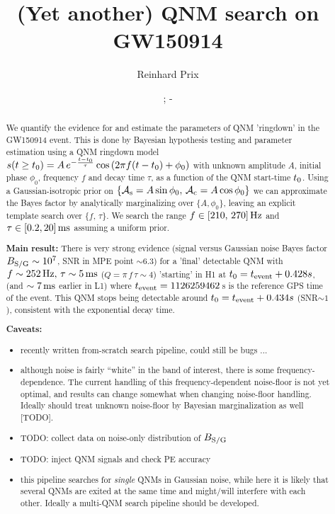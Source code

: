 \documentclass[aps,prd,onecolumn,notitlepage,nofootinbib,superscriptaddress,altaffilletter,floatfix]{revtex4-1}
\begin{document}
\title{(Yet another) QNM search on GW150914}


\author{Reinhard Prix}
\date{\commitDATE; \commitIDshort-\commitSTATUS}


\begin{abstract}
  We quantify the evidence for and estimate the parameters of QNM 'ringdown' in the GW150914 event.
  This is done by Bayesian hypothesis testing and parameter estimation using a QNM ringdown model
  $s(t\ge t_0) = A\,e^{-\frac{t-t_0}{\tau}}\cos\left(2\pi f (t-t_0) + \phi_0\right)$ with unknown amplitude $A$, initial phase $\phi_0$,
  frequency $f$ and decay time $\tau$, as a function of the QNM start-time $t_0$.
  Using a Gaussian-isotropic prior on $\{\mathcal{A}_{\mathrm{s}}=A\sin\phi_0,\,\mathcal{A}_{\mathrm{c}}=A\cos\phi_0\}$ we can approximate the Bayes factor by analytically marginalizing over
  $\{A,\phi_0\}$, leaving an explicit template search over $\{f,\,\tau\}$. We search the range $f\in[210,\,270]\,\mathrm{Hz}$ and $\tau \in [0.2, 20]\,\mathrm{ms}$
  assuming a uniform prior.

  \textbf{Main result:}
  There is very strong evidence (signal versus Gaussian noise Bayes factor $B_{\mathrm{S/G}}\sim10^{7}$, SNR in MPE point $\sim6.3$) for a 'final' detectable QNM
  with $f\sim252\,\mathrm{Hz},\,\tau\sim5\,\mathrm{ms}$ ($Q = \pi\,f\,\tau \sim 4$) 'starting' in H1 at $t_0 = t_{\mathrm{event}} + 0.428s$, (and $\sim7\,\mathrm{ms}$ earlier in L1)
  where $t_{\mathrm{event}} = 1126259462\,$s is the reference GPS time of the event.
  This QNM stops being detectable around $t_0 = t_{\mathrm{event}}+0.434s$ (SNR$\sim1$), consistent with the exponential decay time.

  \textbf{Caveats:}
  \begin{itemize}
  \item recently written from-scratch search pipeline, could still be bugs ...
  \item although noise is fairly ``white'' in the band of interest, there is some frequency-dependence. The current handling of this
    frequency-dependent noise-floor is not yet optimal, and results can change somewhat when changing noise-floor handling.
    Ideally should treat unknown noise-floor by Bayesian marginalization as well [TODO].
  \item TODO: collect data on noise-only distribution of $B_{\mathrm{S/G}}$
  \item TODO: inject QNM signals and check PE accuracy
  \item this pipeline searches for \emph{single} QNMs in Gaussian noise, while here it is likely that several QNMs are exited at the same time and
    might/will interfere with each other. Ideally a multi-QNM search pipeline should be developed.
  \end{itemize}
\end{abstract}
\end{document}

